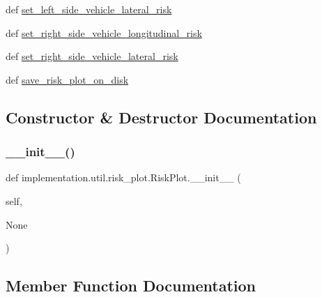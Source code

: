 \begin{DoxyCompactItemize}
def \hyperlink{classimplementation_1_1util_1_1risk__plot_1_1_risk_plot_a526e53adb44b439d39ad56f01b433b4b}{set\+\_\+left\+\_\+side\+\_\+vehicle\+\_\+lateral\+\_\+risk}
\item 
def \hyperlink{classimplementation_1_1util_1_1risk__plot_1_1_risk_plot_ae509278a9de364e6626c1ae12c80084f}{set\+\_\+right\+\_\+side\+\_\+vehicle\+\_\+longitudinal\+\_\+risk}
\item 
def \hyperlink{classimplementation_1_1util_1_1risk__plot_1_1_risk_plot_a80e5957e1f16e86a9c19e0b89777c286}{set\+\_\+right\+\_\+side\+\_\+vehicle\+\_\+lateral\+\_\+risk}
\item 
def \hyperlink{classimplementation_1_1util_1_1risk__plot_1_1_risk_plot_afa07c0b2874bbad1b3e98756f20e5d31}{save\+\_\+risk\+\_\+plot\+\_\+on\+\_\+disk}
\end{DoxyCompactItemize}


\subsection{Constructor \& Destructor Documentation}
\mbox{\label{classimplementation_1_1util_1_1risk__plot_1_1_risk_plot_a574b3dc33ab0b1859a5167eed072a321}} 
\subsubsection{\texorpdfstring{\+\_\+\+\_\+init\+\_\+\+\_\+()}{\_\_init\_\_()}}
{\footnotesize\ttfamily def implementation.\+util.\+risk\+\_\+plot.\+Risk\+Plot.\+\_\+\+\_\+init\+\_\+\+\_\+ (\begin{DoxyParamCaption}\item[{}]{self,  }\item[{}]{None }\end{DoxyParamCaption})}



\subsection{Member Function Documentation}
\mbox{\label{classimplementation_1_1util_1_1risk__plot_1_1_risk_plot_a7055e0167a4c656e1b76a1363c1941af}} 
